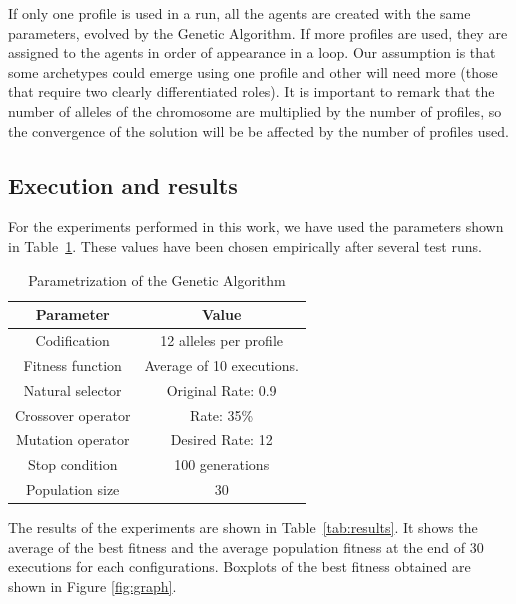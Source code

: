 \documentclass[letterpaper]{article}
\begin{document}
If only one profile is used
in a run, all the agents are created with the same parameters, evolved
by the Genetic Algorithm. If more profiles are used, they are assigned
to the agents in order of appearance in a loop. Our assumption is that
some archetypes could emerge using one profile and other will need
more (those that require two clearly differentiated roles). It is
important to remark that the number of alleles of the chromosome are
multiplied by the number of profiles, so the convergence of the
solution will be be affected by the number of profiles used.




\subsection{Execution and results}

For the experiments performed in this work, we have used the parameters shown in Table~\ref{fig:ga_parameters}. These values have been chosen empirically after several test runs.


\begin{table}
\begin{center}

\begin{tabular}{|c|c|}%
\hline
Parameter & Value \\
\hline\hline
Codification & 12 alleles per profile\\
Fitness function & Average of 10 executions.\\
Natural selector & Original Rate: 0.9 \\
Crossover operator & Rate: 35\% \\
Mutation operator & Desired Rate: 12 \\
Stop condition & 100 generations\\
Population size & 30 \\
\hline
\end{tabular}


\end{center}
\vskip 0.25cm
\caption{Parametrization of the Genetic Algorithm}
\label{fig:ga_parameters}
\end{table}







The results of the experiments are shown in
Table~\ref{tab:results}. It shows the average of the best fitness
and the average population fitness at the end of 30 executions for
each configurations. Boxplots of the best fitness obtained are shown
in Figure \ref{fig:graph}. 
\end{document}
